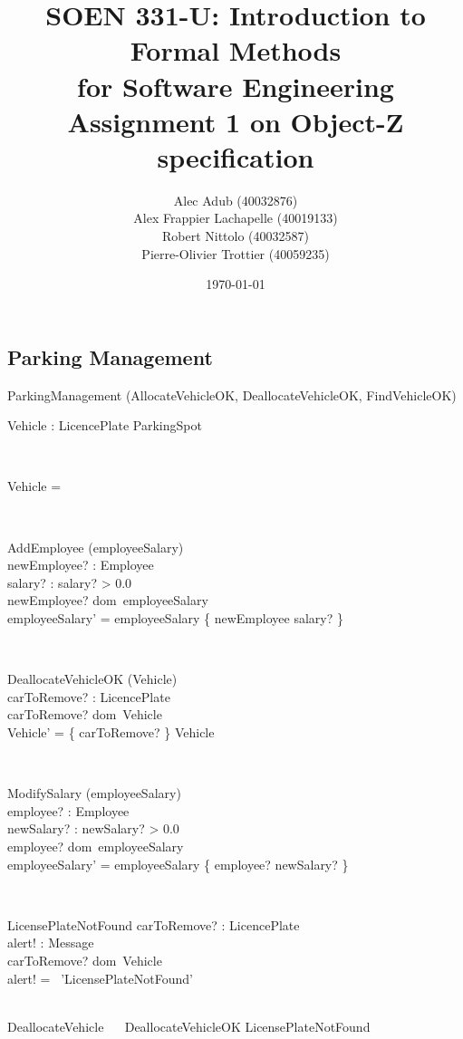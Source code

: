 \documentclass[12pt]{article}
\title{SOEN 331-U: Introduction to Formal Methods\\for Software Engineering\\
Assignment 1 on Object-Z specification}
\author{\begin{tabular}{c}
Alec Adub (40032876) \tabularnewline
Alex Frappier Lachapelle (40019133) \tabularnewline
Robert Nittolo (40032587) \tabularnewline
Pierre-Olivier Trottier (40059235) \tabularnewline\\
\end{tabular}
}
\date{\today}
\begin{document}
\begin{spacing}{1.5}

\maketitle

\newpage

\section{Parking Management}

\begin{class}{ParkingManagement}
\also
\upharpoonright (AllocateVehicleOK, DeallocateVehicleOK, FindVehicleOK) \\
\begin{state}
Vehicle : LicencePlate  \rightarrowtail ParkingSpot\\
\where
\end{state} \\
\begin{init}
Vehicle = \emptyset %
\end{init} \\
\begin{op}{AddEmployee}
\Delta (employeeSalary) \\
newEmployee? : Employee\\
salary? : 
\ST
salary? > 0.0 \\
newEmployee? \notin dom~employeeSalary\\
employeeSalary' = employeeSalary \cup \{ newEmployee \mapsto salary? \}
\end{op}\\
\begin{op}{DeallocateVehicleOK}
\Delta (Vehicle) \\
carToRemove? : LicencePlate\\
\ST
carToRemove? \in dom~Vehicle\\
Vehicle' = \{ carToRemove? \} \ndres Vehicle
\end{op}\\
\begin{op}{ModifySalary}
\Delta (employeeSalary) \\
employee? : Employee\\
newSalary? : 
\ST
newSalary? > 0.0 \\
employee? \in dom~employeeSalary\\
employeeSalary' = employeeSalary \oplus \{ employee? \mapsto newSalary? \}
\end{op}\\
\begin{op}{LicensePlateNotFound}
carToRemove? : LicencePlate\\
alert! : Message\\
\ST
carToRemove? \notin dom~Vehicle\\
alert! = \ 'LicensePlateNotFound'
\end{op}\\
DeallocateVehicle  \ \mathrel{\widehat{=}} \ DeallocateVehicleOK \vee LicensePlateNotFound 
\end{class}


\end{spacing}
\end{document}
